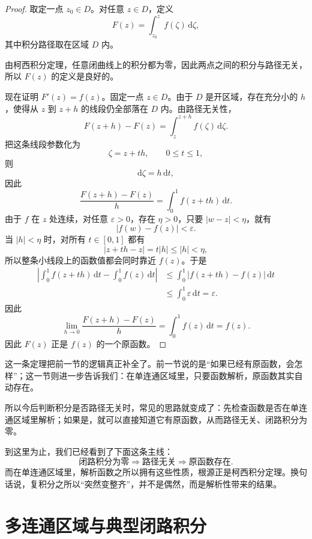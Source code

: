\begin{proof}
取定一点 $z_0\in D$。对任意 $z\in D$，定义
\[
    F(z)=\int_{z_0}^{z} f(\zeta)\,\mathrm{d}\zeta,
\]
其中积分路径取在区域 $D$ 内。

由柯西积分定理，任意闭曲线上的积分都为零，因此两点之间的积分与路径无关，所以 $F(z)$ 的定义是良好的。

现在证明 $F'(z)=f(z)$。固定一点 $z\in D$。由于 $D$ 是开区域，存在充分小的 $h$，使得从 $z$ 到 $z+h$ 的线段仍全部落在 $D$ 内。由路径无关性，
\[
    F(z+h)-F(z)=\int_z^{z+h} f(\zeta)\,\mathrm{d}\zeta.
\]
把这条线段参数化为
\[
    \zeta=z+th,\qquad 0\le t\le 1,
\]
则
\[
    \mathrm{d}\zeta=h\,\mathrm{d}t,
\]
因此
\[
    \frac{F(z+h)-F(z)}{h}
    = \int_0^1 f(z+th)\,\mathrm{d}t.
\]
由于 $f$ 在 $z$ 处连续，对任意 $\varepsilon>0$，存在 $\eta>0$，只要 $|w-z|<\eta$，就有
\[
    |f(w)-f(z)|<\varepsilon.
\]
当 $|h|<\eta$ 时，对所有 $t\in[0,1]$ 都有
\[
    |z+th-z|=t|h|\le |h|<\eta,
\]
所以整条小线段上的函数值都会同时靠近 $f(z)$。于是
\begin{align}
    \left|\int_0^1 f(z+th)\,\mathrm{d}t-\int_0^1 f(z)\,\mathrm{d}t\right|
    &\le \int_0^1 |f(z+th)-f(z)|\,\mathrm{d}t \\
    &\le \int_0^1 \varepsilon\,\mathrm{d}t=\varepsilon.
\end{align}
因此
\[
    \lim_{h\to 0}\frac{F(z+h)-F(z)}{h}
    = \int_0^1 f(z)\,\mathrm{d}t
    = f(z).
\]
因此 $F(z)$ 正是 $f(z)$ 的一个原函数。
\end{proof}

\begin{tishi}[这条存在定理的意义和用法]
这一条定理把前一节的逻辑真正补全了。前一节说的是``如果已经有原函数，会怎样''；这一节则进一步告诉我们：在单连通区域里，只要函数解析，原函数其实自动存在。

所以今后判断积分是否路径无关时，常见的思路就变成了：先检查函数是否在单连通区域里解析；如果是，就可以直接知道它有原函数，从而路径无关、闭路积分为零。
\end{tishi}

\begin{tishi}[三件事其实连在一起]
到这里为止，我们已经看到了下面这条主线：
\[
    \text{闭路积分为零} \Longrightarrow \text{路径无关} \Longrightarrow \text{原函数存在}.
\]
而在单连通区域里，解析函数之所以拥有这些性质，根源正是柯西积分定理。换句话说，复积分之所以``突然变整齐''，并不是偶然，而是解析性带来的结果。
\end{tishi}

\section{多连通区域与典型闭路积分}

